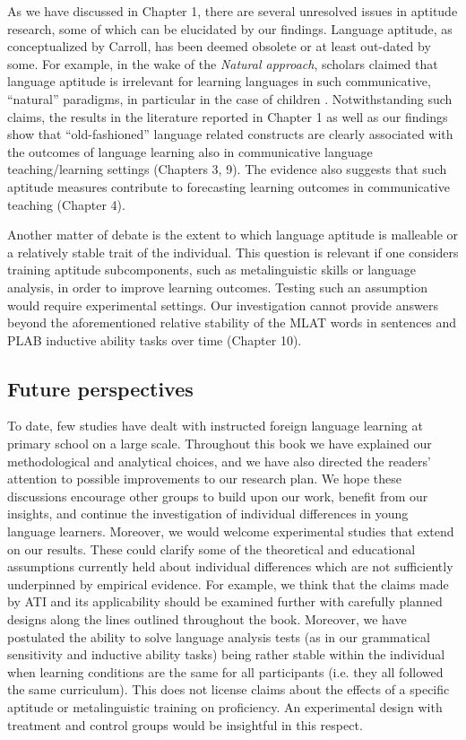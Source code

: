 \documentclass[output=paper]{langsci/langscibook}
\begin{document}
As we have discussed in Chapter 1, there are several unresolved issues in aptitude research, some of which can be elucidated by our findings. Language aptitude, as conceptualized by Carroll, has been deemed obsolete or at least out-dated by some. For example, in the wake of the \textit{Natural approach}, scholars claimed that language aptitude is irrelevant for learning languages in such communicative, ``natural'' paradigms, in particular in the case of children \citep[72]{Skehan2002}. Notwithstanding such claims, the results in the literature reported in Chapter 1 as well as our findings show that ``old-fashioned'' language related constructs are clearly associated with the outcomes of language learning also in communicative language teaching/learning settings (Chapters 3, 9). The evidence also suggests that such aptitude measures contribute to forecasting learning outcomes in communicative teaching (Chapter 4). 

Another matter of debate is the extent to which language aptitude is malleable or a relatively stable trait of the individual. This question is relevant if one considers training aptitude subcomponents, such as metalinguistic skills or language analysis, in order to improve learning outcomes. Testing such an assumption would require experimental settings. Our investigation cannot provide answers beyond the aforementioned relative stability of the MLAT words in sentences and PLAB inductive ability tasks over time (Chapter 10). 

\subsection{Future perspectives}

To date, few studies have dealt with instructed foreign language learning at primary school on a large scale. Throughout this book we have explained our methodological and analytical choices, and we have also directed the readers' attention to possible improvements to our research plan. We hope these discussions encourage other groups to build upon our work, benefit from our insights, and continue the investigation of individual differences in young language learners. Moreover, we would welcome experimental studies that extend on our results. These could clarify some of the theoretical and educational assumptions currently held about individual differences which are not sufficiently underpinned by empirical evidence. For example, we think that the claims made by ATI and its applicability should be examined further with carefully planned designs along the lines outlined throughout the book. Moreover, we have postulated the ability to solve language analysis tests (as in our grammatical sensitivity and inductive ability tasks) being rather stable within the individual when learning conditions are the same for all participants (i.e. they all followed the same curriculum). This does not license claims about the effects of a specific aptitude or metalinguistic training on proficiency. An experimental design with treatment and control groups would be insightful in this respect. 
\end{document}
